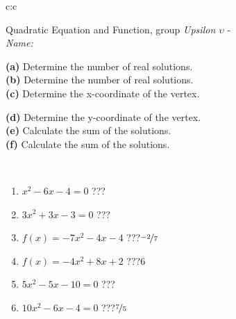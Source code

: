 \documentclass[10pt]{report}
\begin{document}
\begin{tabular}{c:c}
\begin{minipage}[c][104.5mm][t]{0.5\linewidth}
\begin{center}
\vspace{7mm}
{\huge {\LARGE Quadratic Equation and Function}, group \textit{Upsilon $\upsilon$} -}\\[5mm]
\textit{Name:}\phantom{xxxxxxxxxxxxxxxxxxxxxxxxxxxxxxxxxxxxxxxxxxxxxxxxxxxxxxxxxxxxxxxxx}\\[5mm]
\begin{minipage}{0.95\linewidth}
\begin{center}
{\small \begin{minipage}{0.5\textwidth}
\textbf{(a)} Determine the number of real solutions. \\[1mm]
\textbf{(b)} Determine the number of real solutions. \\[1mm]
\textbf{(c)} Determine the x-coordinate of the vertex.
\end{minipage} \begin{minipage}{0.49\textwidth}
\textbf{(d)} Determine the y-coordinate of the vertex. \\[1mm]
\textbf{(e)} Calculate the sum of the solutions. \\[1mm]
\textbf{(f)} Calculate the sum of the solutions.
\end{minipage}
}
\end{center}
\end{minipage}
\\[4mm]
\begin{minipage}{0.79\linewidth}
\begin{center}
\begin{varwidth}{\linewidth}
\begin{enumerate}
\Large
\item $x^2-6x-4=0$\quad \dotfill\; ???\;\dotfill {}
\item $3x^2+3x-3=0$\quad \dotfill\; ???\;\dotfill {}
\item $f(x)=-7x^2-4x-4$\quad \dotfill\; ???\;\dotfill \quad $\nicefrac{-2}{7}$
\item $f(x)=-4x^2+8x+2$\quad \dotfill\; ???\;\dotfill \quad $6$
\item $5x^2-5x-10=0$\quad \dotfill\; ???\;\dotfill {}
\item $10x^2-6x-4=0$\quad \dotfill\; ???\;\dotfill \quad $\nicefrac{7}{5}$
\end{enumerate}
\end{varwidth}

\end{center}
\end{minipage}
\end{center}
\end{minipage}
\end{tabular}
\end{document}
